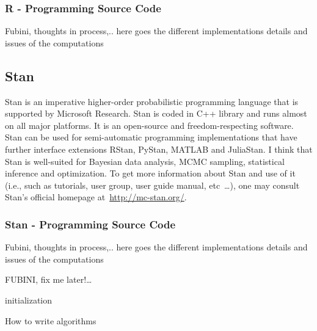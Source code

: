 \documentclass[a4paper,11pt,english]{article}
\begin{document}
				\subsubsection{R - Programming Source Code} 
				
				Fubini, thoughts in process,.. here goes the different implementations details and issues of the computations
	
			\subsection{Stan} 
			
			Stan is an imperative higher-order probabilistic programming language that is supported by Microsoft Research. Stan is coded in C++ library and 
			runs almost on all major platforms. It is an open-source and freedom-respecting software. Stan can be used for semi-automatic programming 
			implementations that have further interface extensions RStan, PyStan, MATLAB and JuliaStan.  I think that Stan is well-suited for Bayesian 
			data analysis, MCMC sampling, statistical inference and optimization. To get more information about Stan and use of it (i.e., such as 
			tutorials, user group, user guide manual, etc~\ldots), one may consult Stan's official homepage at~\url{http://mc-stan.org/}. 

			
				\subsubsection{Stan - Programming  Source Code} 
		
				Fubini, thoughts in process,.. here goes the different implementations details and issues of the computations
			

			FUBINI, fix me later!\ldots
			
				\begin{algorithm}[H]
 initialization\;
 \caption{How to write algorithms}
\end{algorithm}
\end{document}
